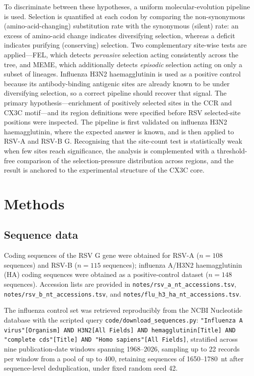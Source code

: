 \documentclass[11pt]{article}
\begin{document}
To discriminate between these hypotheses, a uniform molecular-evolution pipeline is used. Selection is quantified at each codon by comparing the non-synonymous (amino-acid-changing) substitution rate with the synonymous (silent) rate: an excess of amino-acid change indicates diversifying selection, whereas a deficit indicates purifying (conserving) selection. Two complementary site-wise tests are applied---FEL, which detects \emph{pervasive} selection acting consistently across the tree, and MEME, which additionally detects \emph{episodic} selection acting on only a subset of lineages. Influenza H3N2 haemagglutinin is used as a positive control because its antibody-binding antigenic sites are already known to be under diversifying selection, so a correct pipeline should recover that signal. The primary hypothesis---enrichment of positively selected sites in the CCR and CX3C motif---and its region definitions were specified before RSV selected-site positions were inspected. The pipeline is first validated on influenza H3N2 haemagglutinin, where the expected answer is known, and is then applied to RSV-A and RSV-B G. Recognising that the site-count test is statistically weak when few sites reach significance, the analysis is complemented with a threshold-free comparison of the selection-pressure distribution across regions, and the result is anchored to the experimental structure of the CX3C core.

\section{Methods}

\subsection{Sequence data}

Coding sequences of the RSV G gene were obtained for RSV-A ($n=108$ sequences) and RSV-B ($n=115$ sequences); influenza A/H3N2 haemagglutinin (HA) coding sequences were obtained as a positive-control dataset ($n=148$ sequences). Accession lists are provided in \texttt{notes/rsv\_a\_nt\_accessions.tsv}, \texttt{notes/rsv\_b\_nt\_accessions.tsv}, and \texttt{notes/flu\_h3\_ha\_nt\_accessions.tsv}.

The influenza control set was retrieved reproducibly from the NCBI Nucleotide database with the scripted query \texttt{code/download\_sequences.py}: \texttt{"Influenza A virus"[Organism] AND H3N2[All Fields] AND hemagglutinin[Title] AND "complete cds"[Title] AND "Homo sapiens"[All Fields]}, stratified across nine publication-date windows spanning 1968--2026, sampling up to 22 records per window from a pool of up to 400, retaining sequences of 1650--1780~nt after sequence-level deduplication, under fixed random seed 42.
\end{document}
